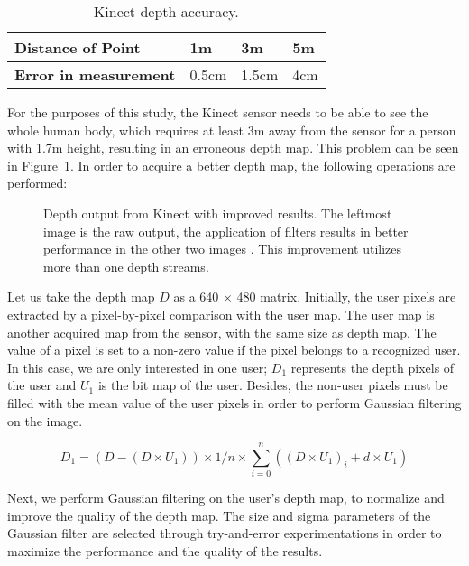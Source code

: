 \begin{table}
\center
\begin{tabular}{ | l | l | l | l |}
\hline
\textbf{Distance of Point} & 1m & 3m & 5m \\ \hline
\textbf{Error in measurement} & 0.5cm & 1.5cm & 4cm \\ 
\hline
\end{tabular}
\caption{Kinect depth accuracy.}
\label{tbl:error_kinect}
\end{table}

For the purposes of this study, the Kinect sensor needs to be able to see the whole human body, which requires at least 3m away from the sensor for a person with 1.7m height, resulting in an erroneous depth map. This problem can be seen in Figure~\ref{fig:kinect_depth_output_comparison}. In order to acquire a better depth map, the following operations are performed:

\begin{figure}[h]
\centerline{}
\caption{Depth output from Kinect with improved results. The leftmost image is the raw output, the application of filters results in better performance in the other two images \cite{Tong2012}. This improvement utilizes more than one depth streams.}
\label{fig:kinect_depth_output_comparison}
\end{figure}


Let us take the depth map $D$ as a 640 $\times$ 480 matrix. Initially, the user pixels are extracted by a pixel-by-pixel comparison with the user map. The user map is another acquired map from the sensor, with the same size as depth map. The value of a pixel is set to a non-zero value if the pixel belongs to a recognized user. In this case, we are only interested in one user; $D_1$ represents the depth pixels of the user and $U_1$ is the bit map of the user. Besides, the non-user pixels must be filled with the mean value of the user pixels in order to perform Gaussian filtering on the image.

\begin{equation}
D_1=(D-(D \times U_1 )) \times 1/n \times \sum\limits_{i=0}^n ((D \times U_1 )_i + d \times U_1 )
\label{eqn:patch_depth}
\end{equation}

Next, we perform Gaussian filtering on the user's depth map, to normalize and improve the quality of the depth map. The size and sigma parameters of the Gaussian filter are selected through try-and-error experimentations in order to maximize the performance and the quality of the results. 

